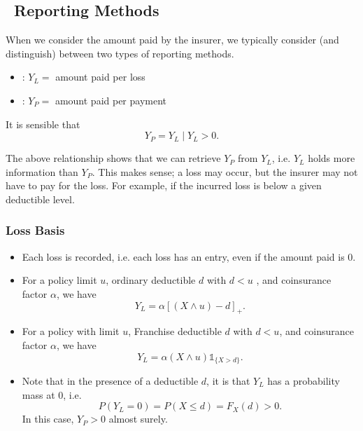 \documentclass[notoc,notitlepage]{tufte-book}
\begin{document}

\subsection{\imponote\ Reporting Methods}%
\label{sub:reporting_methods}

When we consider the amount paid by the insurer, we typically consider (and distinguish) between two types of reporting methods.
\begin{itemize}
  \item {}: $Y_L =$ amount paid per loss
  \item {}: $Y_P =$ amount paid per payment
\end{itemize}
It is sensible that
\begin{equation}\label{eq:relationship_of_YP_and_YL}
  Y_P = Y_L \mid Y_L > 0.
\end{equation}

The above relationship shows that we can retrieve $Y_P$ from $Y_L$, i.e. $Y_L$ holds more information than $Y_P$. This makes sense; a loss may occur, but the insurer may not have to pay for the loss. For example, if the incurred loss is below a given deductible level.

\subsubsection{Loss Basis}%
\label{ssub:loss_basis}

\begin{itemize}
  \item Each loss is recorded, i.e. each loss has an entry, even if the amount paid is $0$.
  \item For a policy limit $u$, ordinary deductible $d$ with $d < u$ , and coinsurance factor $\alpha$, we have
    \begin{equation*}
      Y_L = \alpha [ ( X \land u ) - d ]_+.
    \end{equation*}
  \item For a policy with limit $u$, Franchise deductible $d$ with $d < u$, and coinsurance factor $\alpha$, we have
    \begin{equation*}
      Y_L = \alpha (X \land u) \mathbb{1}_{\{ X > d \}}.
    \end{equation*}
  \item Note that in the presence of a deductible $d$, it is  that $Y_L$ has a probability mass at $0$, i.e.
    \begin{equation*}
      P(Y_L = 0) = P(X \leq d) = F_X(d) > 0.
    \end{equation*}
    In this case, $Y_P > 0$ almost surely.
\end{itemize}
\end{document}
